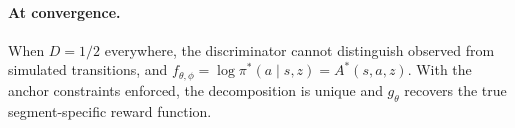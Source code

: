 \paragraph{At convergence.}
When $D = 1/2$ everywhere, the discriminator cannot distinguish observed from simulated transitions, and $f_{\theta,\phi} = \log \pi^*(a \mid s, z) = A^*(s, a, z)$.
With the anchor constraints enforced, the decomposition is unique and $g_\theta$ recovers the true segment-specific reward function.
